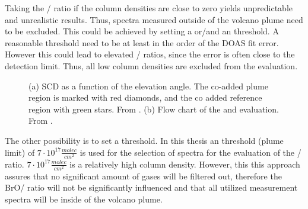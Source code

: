 %
Taking the / ratio if the column densities are close to zero yields unpredictable and unrealistic results. Thus, spectra measured outside of the volcano plume need to be excluded.
This could be achieved by setting a  or/and an  threshold. A reasonable  threshold need to be at least in the order of the DOAS fit error. However this could lead to elevated / ratios, since the  error is often close to the detection limit. Thus, all low  column densities are excluded from the evaluation.
%
\begin{figure}
	\caption{(a)  SCD as a function of the elevation angle. The co-added plume region is marked with red diamonds, and the co added reference region with green stars. From \cite{WarnachSimon}. (b) Flow chart of the   and  evaluation. From \cite{lubcke2014optical}.}
	\label{fig:algorithm}
\end{figure}
The other possibility is to set a  threshold. In this thesis an  threshold (plume limit) of $7\cdot 10^{17} \frac{molec}{cm^2}$ is used for the selection of spectra for the evaluation of the / ratio. $7\cdot 10^{17} \frac{molec}{cm^2}$ is a relatively high column density. However, this this approach assures that no significant amount of gases will be filtered out, therefore the BrO/ ratio will not be significantly influenced \citep{lubcke2014bro} and that all utilized measurement spectra will be inside of the volcano plume. \\
